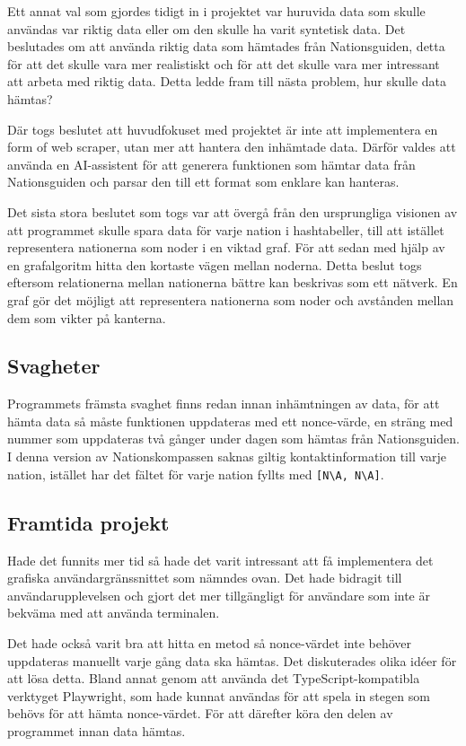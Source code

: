 \documentclass[a4paper, 12pt]{article}
\begin{document}
        Ett annat val som gjordes tidigt in i projektet var huruvida data som skulle användas var riktig data eller om den skulle ha varit syntetisk data. Det beslutades om att använda riktig data som hämtades från Nationsguiden, detta för att det skulle vara mer realistiskt och för att det skulle vara mer intressant att arbeta med riktig data. Detta ledde fram till nästa problem, hur skulle data hämtas? 


        Där togs beslutet att huvudfokuset med projektet är inte att implementera en form of web scraper, utan mer att hantera den inhämtade data. Därför valdes att använda en AI-assistent för att generera funktionen som hämtar data från Nationsguiden och parsar den till ett format som enklare kan hanteras.

        
        Det sista stora beslutet som togs var att övergå från den ursprungliga visionen av att programmet skulle spara data för varje nation i hashtabeller, till att istället representera nationerna som noder i en viktad graf. För att sedan med hjälp av en grafalgoritm hitta den kortaste vägen mellan noderna. Detta beslut togs eftersom relationerna mellan nationerna bättre kan beskrivas som ett nätverk. En graf gör det möjligt att representera nationerna som noder och avstånden mellan dem som vikter på kanterna. 

    \subsection{Svagheter}
    \label{subsec: svagheter}
        Programmets främsta svaghet finns redan innan inhämtningen av data, för att hämta data så måste funktionen uppdateras med ett nonce-värde, en sträng med nummer som uppdateras två gånger under dagen som hämtas från Nationsguiden. I denna version av Nationskompassen saknas giltig kontaktinformation till varje nation, istället har det fältet för varje nation fyllts med \texttt{[N\textbackslash A, N\textbackslash A]}.

    \subsection{Framtida projekt}
    \label{subsec: framtid}
        Hade det funnits mer tid så hade det varit intressant att få implementera det grafiska användargränssnittet som nämndes ovan. Det hade bidragit till användarupplevelsen och gjort det mer tillgängligt för användare som inte är bekväma med att använda terminalen.


        Det hade också varit bra att hitta en metod så nonce-värdet inte behöver uppdateras manuellt varje gång data ska hämtas. Det diskuterades olika idéer för att lösa detta. Bland annat genom att använda det TypeScript-kompatibla verktyget Playwright, som hade kunnat användas för att spela in stegen som behövs för att hämta nonce-värdet. För att därefter köra den delen av programmet innan data hämtas.
\end{document}

